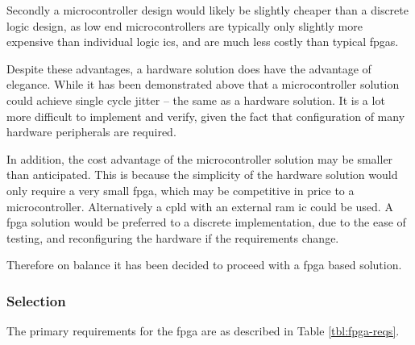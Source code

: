 Secondly a microcontroller design would likely be slightly cheaper than a discrete logic design, as low end microcontrollers are typically only slightly more expensive than individual logic \glspl{ic}, and are much less costly than typical \glspl{fpga}.

Despite these advantages, a hardware solution does have the advantage of elegance. While it has been demonstrated above that a microcontroller solution could achieve single cycle jitter -- the same as a hardware solution. It is a lot more difficult to implement and verify, given the fact that configuration of many hardware peripherals are required.

In addition, the cost advantage of the microcontroller solution may be smaller than anticipated. This is because the simplicity of the hardware solution would only require a very small \gls{fpga}, which may be competitive in price to a microcontroller. Alternatively a \gls{cpld} with an external \gls{ram} \gls{ic} could be used. A \gls{fpga} solution would be preferred to a discrete implementation, due to the ease of testing, and reconfiguring the hardware if the requirements change.

Therefore on balance it has been decided to proceed with a \gls{fpga} based solution.

\subsubsection{ Selection}

The primary requirements for the \gls{fpga} are as described in Table \ref{tbl:fpga-reqs}.

